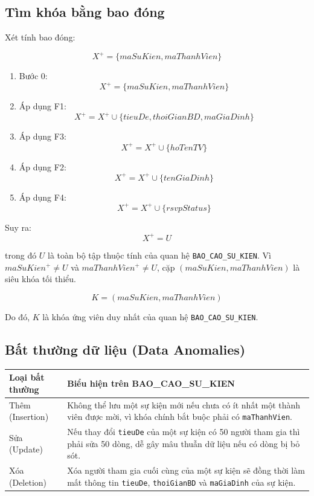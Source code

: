 \subsection{Tìm khóa bằng bao đóng}

Xét tính bao đóng:

\[
X^+ = \{maSuKien, maThanhVien\}
\]

\begin{enumerate}
    \item Bước 0:
    \[
    X^+ = \{maSuKien, maThanhVien\}
    \]
    \item Áp dụng F1:
    \[
    X^+ = X^+ \cup \{tieuDe, thoiGianBD, maGiaDinh\}
    \]
    \item Áp dụng F3:
    \[
    X^+ = X^+ \cup \{hoTenTV\}
    \]
    \item Áp dụng F2:
    \[
    X^+ = X^+ \cup \{tenGiaDinh\}
    \]
    \item Áp dụng F4:
    \[
    X^+ = X^+ \cup \{rsvpStatus\}
    \]
\end{enumerate}
Suy ra:
\[
X^+ = U
\]

trong đó $U$ là toàn bộ tập thuộc tính của quan hệ \texttt{BAO\_CAO\_SU\_KIEN}. Vì $maSuKien^+ \neq U$ và $maThanhVien^+ \neq U$, cặp $(maSuKien, maThanhVien)$ là siêu khóa tối thiểu.

\[
\boxed{K=(maSuKien,maThanhVien)}
\]

Do đó, $K$ là khóa ứng viên duy nhất của quan hệ \texttt{BAO\_CAO\_SU\_KIEN}.

\subsection{Bất thường dữ liệu (Data Anomalies)}

\begin{center}
\begin{tabularx}{\linewidth}{@{}l>{\raggedright\arraybackslash}X@{}}
\toprule
\textbf{Loại bất thường} & \textbf{Biểu hiện trên BAO\_CAO\_SU\_KIEN} \\
\midrule
Thêm (Insertion) &
Không thể lưu một sự kiện mới nếu chưa có ít nhất một thành viên được mời, vì khóa chính bắt buộc phải có \texttt{maThanhVien}. \\

Sửa (Update) &
Nếu thay đổi \texttt{tieuDe} của một sự kiện có 50 người tham gia thì phải sửa 50 dòng, dễ gây mâu thuẫn dữ liệu nếu có dòng bị bỏ sót. \\

Xóa (Deletion) &
Xóa người tham gia cuối cùng của một sự kiện sẽ đồng thời làm mất thông tin \texttt{tieuDe}, \texttt{thoiGianBD} và \texttt{maGiaDinh} của sự kiện. \\
\bottomrule
\end{tabularx}
\end{center}

